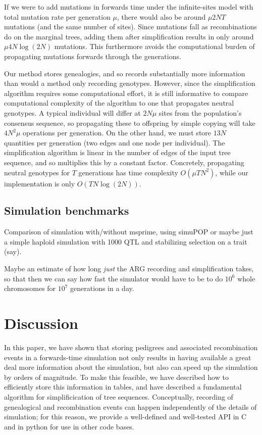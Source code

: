 \documentclass{article}
\begin{document}
If we were to add mutations in forwards time 
under the infinite-sites model with total mutation rate per generation $\mu$,
there would also be around $\mu 2NT$ mutations (and the same number of sites).
Since mutations fall as recombinations do on the marginal trees,
adding them after simplification results in only around $\mu 4 N \log(2N)$ mutations.
This furthermore avoids the computational burden of propagating mutations forwards through the generations.

Our method stores genealogies, and so records substantially more information 
than would a method only recording genotypes.
However, since the simplification algorithm requires some computational effort,
it is still informative to compare computational complexity of the algorithm
to one that propagates neutral genotypes.
A typical individual will differ at $2 N \mu$ sites from the population's consensus sequence,
so propagating these to offspring by simple copying will take $4 N^2 \mu$ operations per generation.
On the other hand, we must store $13N$ quantities per generation (two edges and one node per individual).
The simplification algorithm is linear in the number of edges of the input tree sequence,
and so multiplies this by a constant factor.
Concretely, propagating neutral genotypes for $T$ generations has time complexity $O(\mu T N^2)$,
while our implementation is only $O(T N \log(2N))$.


\subsection*{Simulation benchmarks}

Comparison of simulation with/without msprime, using simuPOP
or maybe just a simple haploid simulation with 1000 QTL and stabilizing selection on a trait (say).

Maybe an estimate of how long \emph{just} the ARG recording and simplification takes,
so that then we can say how fast the simulator would have to be to do $10^6$ whole chromosomes for $10^7$ generations
in a day.


\section*{Discussion}

In this paper, we have shown that storing pedigrees
and associated recombination events
in a forwards-time simulation
not only results in having available a great deal more information about the simulation,
but also can speed up the simulation by orders of magnitude.
To make this feasible, 
we have described how to efficiently store this information in tables,
and have described a fundamental algorithm for simplificication of tree sequences.
Conceptually, recording of genealogical and recombination events
can happen independently of the details of simulation;
for this reason, we provide a well-defined and well-tested API in C and in python
for use in other code bases.
\end{document}
